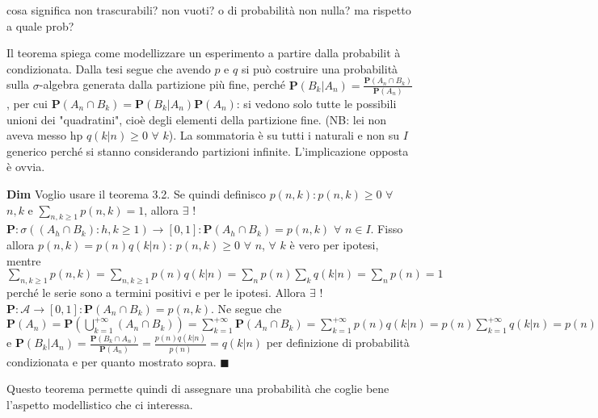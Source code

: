 \documentclass{article}
\begin{document}
cosa significa non trascurabili? non vuoti? o di probabilità non nulla? ma rispetto a quale prob?

Il teorema spiega come modellizzare un esperimento a partire dalla probabilit%
\`{a} condizionata. Dalla tesi segue che avendo $p$ e $q$ si pu\`{o}
costruire una probabilit\`{a} sulla $\sigma $-algebra generata dalla
partizione pi\`{u} fine, perch\'{e} $\mathbf{P}\left( B_{k}|A_{n}\right) 
\mathbf{=}\frac{\mathbf{P}\left( A_{n}\cap B_{k}\right) }{\mathbf{P}\left(
A_{n}\right) }$, per cui $\mathbf{P}\left( A_{n}\cap B_{k}\right) =\mathbf{P}%
\left( B_{k}|A_{n}\right) \mathbf{P}\left( A_{n}\right) $: si vedono solo
tutte le possibili unioni dei "quadratini", cio\`{e} degli elementi della
partizione fine. (NB: lei non aveva messo hp $q\left( k|n\right) \geq 0$ $%
\forall $ $k$). La sommatoria \`{e} su tutti i naturali e non su $I$
generico perch\'{e} si stanno considerando partizioni infinite. L'implicazione
opposta \`{e} ovvia.

\textbf{Dim} Voglio usare il teorema 3.2. Se quindi definisco $p\left(
n,k\right) :p\left( n,k\right) \geq 0$ $\forall $ $n,k$ e $\sum_{n,k\geq
1}p\left( n,k\right) =1$, allora $\exists $ $!$ $\mathbf{P}:\sigma \left(
\left( A_{h}\cap B_{k}\right) :h,k\geq 1\right) \rightarrow \left[ 0,1\right]
:\mathbf{P}\left( A_{h}\cap B_{k}\right) =p\left( n,k\right) $ $\forall $ $%
n\in I$. Fisso allora $p\left( n,k\right) =p\left( n\right) q\left(
k|n\right) $: $p\left( n,k\right) \geq 0$ $\forall $ $n$, $\forall $ $k$ 
\`{e} vero per ipotesi, mentre $\sum_{n,k\geq 1}p\left( n,k\right)
=\sum_{n,k\geq 1}p\left( n\right) q\left( k|n\right) =\sum_{n}p\left(
n\right) \sum_{k}q\left( k|n\right) =\sum_{n}p\left( n\right) =1$ perch\'{e}
le serie sono a termini positivi e per le ipotesi. Allora $\exists $ $!$
$\mathbf{P}:\mathcal{A}\rightarrow \left[ 0,1\right] :\mathbf{P}\left(
A_{n}\cap B_{k}\right) =p\left( n,k\right) $. Ne segue che $\mathbf{P}\left(
A_{n}\right) \mathbf{=P}\left( \bigcup_{k=1}^{+\infty }\left( A_{n}\cap
B_{k}\right) \right) =\sum_{k=1}^{+\infty }\mathbf{P}\left( A_{n}\cap
B_{k}\right) =\sum_{k=1}^{+\infty }p\left( n\right) q\left( k|n\right)
=p\left( n\right) \sum_{k=1}^{+\infty }q\left( k|n\right) =p\left( n\right) $
e $\mathbf{P}\left( B_{k}|A_{n}\right) =\frac{\mathbf{P}\left( B_{k}\cap
A_{n}\right) }{\mathbf{P}\left( A_{n}\right) }=\frac{p\left( n\right)
q\left( k|n\right) }{p\left( n\right) }=q\left( k|n\right) $ per definizione
di probabilit\`{a} condizionata e per quanto mostrato sopra. $\blacksquare $

Questo teorema permette quindi di assegnare una probabilit\`{a} che coglie
bene l'aspetto modellistico che ci interessa.
\end{document}
